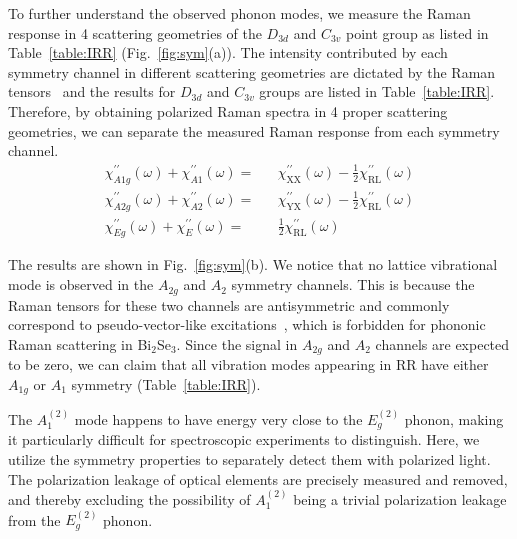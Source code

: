 \documentclass[reprint,aps,pra,superscriptaddress,amsmath,amssymb,linenumbers,longbibliography]{revtex4-1}
\begin{document}
To further understand the observed phonon modes, we measure the Raman response in 4 scattering geometries of the $D_{3d}$ and $C_{3v}$ point group as listed in Table~\ref{table:IRR} (Fig.~\ref{fig:sym}(a)).
The intensity contributed by each symmetry channel in different scattering geometries are dictated by the Raman tensors~\cite{Cardona1982,Ovander1960} and the results for $D_{3d}$ and $C_{3v}$ groups are listed in Table~\ref{table:IRR}.
Therefore, by obtaining polarized Raman spectra in 4 proper scattering geometries, we can separate the measured Raman response from each symmetry channel.
\begin{eqnarray}
\chi^{\prime\prime}_{A1g}(\omega)+\chi^{\prime\prime}_{A1}(\omega)=&&\chi^{\prime\prime}_{\text{XX}}(\omega)-\frac{1}{2}\chi^{\prime\prime}_{\text{RL}}(\omega) \nonumber\\
\chi^{\prime\prime}_{A2g}(\omega)+\chi^{\prime\prime}_{A2}(\omega)=&&\chi^{\prime\prime}_{\text{YX}}(\omega)-\frac{1}{2}\chi^{\prime\prime}_{\text{RL}}(\omega) \\
\chi^{\prime\prime}_{Eg}(\omega)+\chi^{\prime\prime}_{E}(\omega)=&&\frac{1}{2}\chi^{\prime\prime}_{\text{RL}}(\omega) \nonumber
\end{eqnarray}

The results are shown in Fig.~\ref{fig:sym}(b).
We notice that no lattice vibrational mode is observed in the $A_{2g}$ and $A_{2}$ symmetry channels.
This is because the Raman tensors for these two channels are antisymmetric and commonly correspond to pseudo-vector-like excitations~\cite{Ovander1960,Shastry1991,Khveshchenko1994}, which is forbidden for phononic Raman scattering in Bi$_2$Se$_3$.
Since the signal in $A_{2g}$ and $A_{2}$ channels are expected to be zero, we can claim that all vibration modes appearing in RR have either $A_{1g}$ or $A_{1}$ symmetry (Table~\ref{table:IRR}).

The $A_1^{(2)}$ mode happens to have energy very close to the $E_g^{(2)}$ phonon, making it particularly difficult for spectroscopic experiments to distinguish.
Here, we utilize the symmetry properties to separately detect them with polarized light.
The polarization leakage of optical elements are precisely measured and removed, and thereby excluding the possibility of $A_1^{(2)}$ being a trivial polarization leakage from the $E_g^{(2)}$ phonon.
\end{document}
